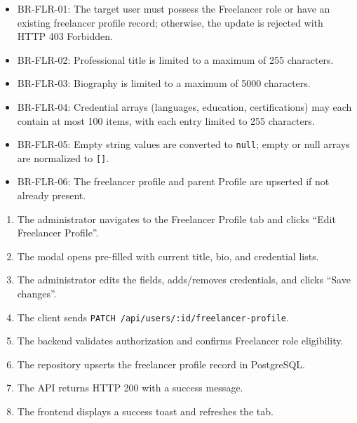 \begin{itemize}[leftmargin=1.6em,topsep=3pt,itemsep=2pt,parsep=0pt,label=$\bullet$]\brrulelist
    \item BR-FLR-01: The target user must possess the Freelancer role or have an existing freelancer profile record; otherwise, the update is rejected with HTTP 403 Forbidden.
    \item BR-FLR-02: Professional title is limited to a maximum of 255 characters.
    \item BR-FLR-03: Biography is limited to a maximum of 5000 characters.
    \item BR-FLR-04: Credential arrays (languages, education, certifications) may each contain at most 100 items, with each entry limited to 255 characters.
    \item BR-FLR-05: Empty string values are converted to \texttt{null}; empty or null arrays are normalized to \texttt{[]}.
    \item BR-FLR-06: The freelancer profile and parent Profile are upserted if not already present.
\end{itemize}

\begin{enumerate}[leftmargin=1.6em,topsep=3pt,itemsep=2pt,parsep=0pt]
    \item The administrator navigates to the Freelancer Profile tab and clicks ``Edit Freelancer Profile''.
    \item The modal opens pre-filled with current title, bio, and credential lists.
    \item The administrator edits the fields, adds/removes credentials, and clicks ``Save changes''.
    \item The client sends \texttt{PATCH /api/users/:id/freelancer-profile}.
    \item The backend validates authorization and confirms Freelancer role eligibility.
    \item The repository upserts the freelancer profile record in PostgreSQL.
    \item The API returns HTTP 200 with a success message.
    \item The frontend displays a success toast and refreshes the tab.
\end{enumerate}

